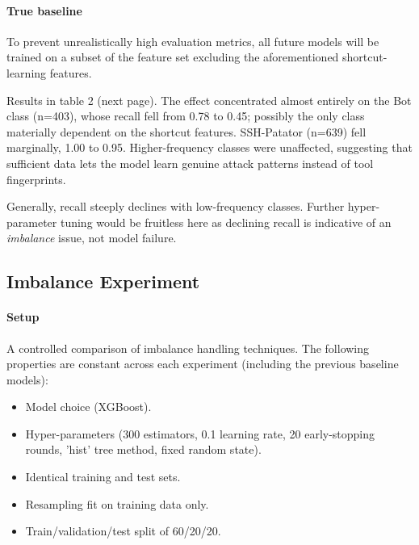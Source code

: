 \documentclass{article}
\begin{document}
\paragraph{True baseline} To prevent unrealistically high evaluation metrics, all future models will be trained on a subset of the feature set excluding the aforementioned shortcut-learning features.

Results in table 2 (next page). The effect concentrated almost entirely on the Bot class (n=403), whose recall fell from 0.78 to 0.45; possibly the only class materially dependent on the shortcut features. SSH-Patator (n=639) fell marginally, 1.00 to 0.95. Higher-frequency classes were unaffected, suggesting that sufficient data lets the model learn genuine attack patterns instead of tool fingerprints.
\par Generally, recall steeply declines with low-frequency classes. Further hyper-parameter tuning would be fruitless here as declining recall is indicative of an \textit{imbalance} issue, not model failure.


\subsection{Imbalance Experiment}
\paragraph{Setup} A controlled comparison of imbalance handling techniques. The following properties are constant across each experiment (including the previous baseline models):
\begin{itemize}
    \item Model choice (XGBoost).
    \item Hyper-parameters (300 estimators, 0.1 learning rate, 20 early-stopping rounds, 'hist' tree method, fixed random state).
    \item Identical training and test sets.
    \item Resampling fit on training data only.
    \item Train/validation/test split of 60/20/20.
\end{itemize}
\end{document}
